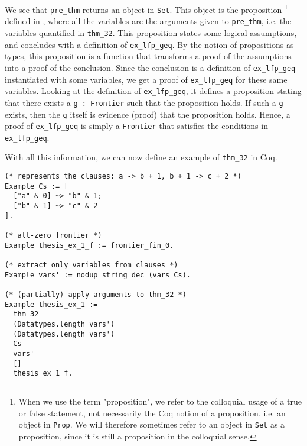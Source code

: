 We see that \lstinline{pre_thm} returns an object in \lstinline{Set}.
This object is the proposition
\footnote{When we use the term "proposition", we refer to the colloquial usage of a true or false statement,
not necessarily the Coq notion of a proposition, i.e. an object in \lstinline{Prop}.
We will therefore sometimes refer to an object in \lstinline{Set} as a proposition, since it is still a proposition in the colloquial sense.}
defined in ,
where all the variables are the arguments given to \lstinline{pre_thm}, i.e. the variables quantified in \lstinline{thm_32}.
This proposition states some logical assumptions, and concludes with a definition of \lstinline{ex_lfp_geq}.
By the notion of propositions as types, this proposition is a function
that transforms a proof of the assumptions into a proof of the conclusion.
Since the conclusion is a definition of \lstinline{ex_lfp_geq} instantiated with some variables,
we get a proof of \lstinline{ex_lfp_geq} for these same variables.
Looking at the definition of \lstinline{ex_lfp_geq},
it defines a proposition stating that there exists a \lstinline{g : Frontier} such that the proposition holds.
If such a \lstinline{g} exists, then the \lstinline{g} itself is evidence (proof) that the proposition holds.
Hence, a proof of \lstinline{ex_lfp_geq} is simply a \lstinline{Frontier} that satisfies the conditions in \lstinline{ex_lfp_geq}.

With all this information, we can now define an example of \lstinline{thm_32} in Coq.

\begin{minipage}{\linewidth}
\begin{lstlisting}[language=Coq, label={lst:thm_32_coq_example}, caption={\lstinline{thm_32} example}]
(* represents the clauses: a -> b + 1, b + 1 -> c + 2 *)
Example Cs := [
  ["a" & 0] ~> "b" & 1;
  ["b" & 1] ~> "c" & 2
].

(* all-zero frontier *)
Example thesis_ex_1_f := frontier_fin_0.

(* extract only variables from clauses *)
Example vars' := nodup string_dec (vars Cs).

(* (partially) apply arguments to thm_32 *)
Example thesis_ex_1 :=
  thm_32
  (Datatypes.length vars')
  (Datatypes.length vars')
  Cs
  vars'
  []
  thesis_ex_1_f.
\end{lstlisting}
\end{minipage}

